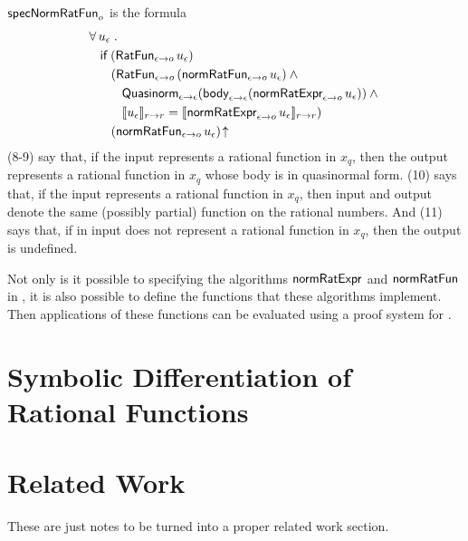 \documentclass[fleqn]{llncs}
\begin{document}
$\mbox{\sf specNormRatFun}_o$ is the formula
\begin{align}
&
\forall\, u_\epsilon \mathrel.\\
& \hspace*{2ex}
\mbox{\sf if} \; (\mbox{\sf RatFun}_{\epsilon \rightarrow o} \, u_\epsilon)\\
& \hspace*{4ex}
(\mbox{\sf RatFun}_{\epsilon \rightarrow o} \, (\mbox{\sf normRatFun}_{\epsilon \rightarrow o} \, u_\epsilon) \wedge {}\\
& \hspace*{6ex}
\mbox{\sf Quasinorm}_{\epsilon \rightarrow \epsilon}(\mbox{\sf body}_{\epsilon \rightarrow \epsilon}(\mbox{\sf normRatExpr}_{\epsilon \rightarrow o} \, u_\epsilon)) \wedge {}\\
& \hspace*{6ex}
\llbracket u_\epsilon\rrbracket_{r \rightarrow r} =
\llbracket\mbox{\sf normRatExpr}_{\epsilon \rightarrow o} \, u_\epsilon\rrbracket_{r \rightarrow r})\\
& \hspace*{4ex}
(\mbox{\sf normRatFun}_{\epsilon \rightarrow o} \, u_\epsilon)\!\uparrow
\end{align}
(8-9) say that, if the input represents a rational function in $x_q$,
then the output represents a rational function in $x_q$ whose body is
in quasinormal form.  (10) says that, if the input represents a
rational function in $x_q$, then input and output denote the same
(possibly partial) function on the rational numbers.  And (11) says
that, if in input does not represent a rational function in $x_q$,
then the output is undefined.

Not only is it possible to specifying the algorithms
$\mbox{\sf normRatExpr}$ and $\mbox{\sf normRatFun}$ in {\churchuqe}, it is
also possible to define the functions that these algorithms implement.
Then applications of these functions can be evaluated using a proof
system for {\churchuqe}.

\section{Symbolic Differentiation of Rational Functions}


\section{Related Work}

These are just notes to be turned into a proper related work section.
\end{document}
